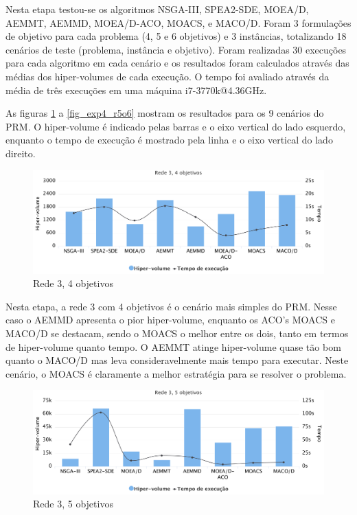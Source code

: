 Nesta etapa testou-se os algoritmos NSGA-III, SPEA2-SDE, MOEA/D, AEMMT, AEMMD, MOEA/D-ACO, MOACS, e MACO/D. Foram 3 formulações de objetivo para cada problema (4, 5 e 6 objetivos) e 3 instâncias, totalizando 18 cenários de teste (problema, instância e objetivo). Foram realizadas 30 execuções para cada algoritmo em cada cenário e os resultados foram calculados através das médias dos hiper-volumes de cada execução. O tempo foi avaliado através da média de três execuções em uma máquina i7-3770k@4.36GHz.

As figuras \ref{fig_exp4_r3o4} a \ref{fig_exp4_r5o6} mostram os resultados para os 9 cenários do PRM. O hiper-volume é indicado pelas barras e o eixo vertical do lado esquerdo, enquanto o tempo de execução é mostrado pela linha e o eixo vertical do lado direito.

\begin{figure}[!htbp]
	\caption{Rede 3, 4 objetivos}
	\label{fig_exp4_r3o4}
	\includegraphics[width=1\textwidth]{cap_experimentos/figs/etapa4/r3o4}
\end{figure}

Nesta etapa, a rede 3 com 4 objetivos é o cenário mais simples do PRM. Nesse caso o AEMMD apresenta o pior hiper-volume, enquanto os ACO's MOACS e MACO/D se destacam, sendo o MOACS o melhor entre os dois, tanto em termos de hiper-volume quanto tempo. O AEMMT atinge hiper-volume quase tão bom quanto o MACO/D mas leva consideravelmente mais tempo para executar. Neste cenário, o MOACS é claramente a melhor estratégia para se resolver o problema.

\begin{figure}[!htbp]
	\caption{Rede 3, 5 objetivos}
	\label{fig_exp4_r3o5}
	\includegraphics[width=1\textwidth]{cap_experimentos/figs/etapa4/r3o5}
\end{figure}

